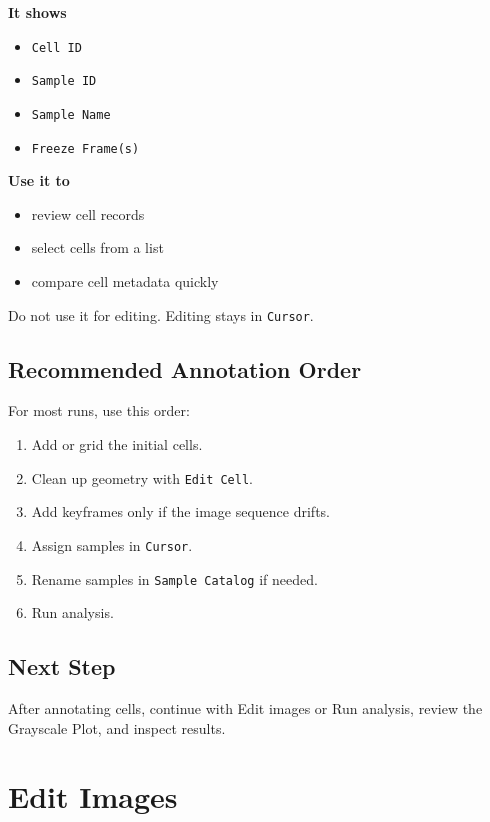 \documentclass[
  9pt,
  letterpaper,
  oneside,
  open=any,
  DIV=15,
  parskip=half-,
  headings=big,
  numbers=noenddot
]{scrbook}
\newcommand{\manuallead}[1]{%
  \vspace{0.15em}%
  {\sffamily\bfseries\color{ManualBlue}#1}\par\nobreak\vspace{0.05em}%
}
\begin{document}
\manuallead{It shows}

\begin{itemize}[leftmargin=*,itemsep=0.35em,topsep=0.4em]
\item \texttt{Cell ID}
\item \texttt{Sample ID}
\item \texttt{Sample Name}
\item \texttt{Freeze Frame(s)}
\end{itemize}

\manuallead{Use it to}

\begin{itemize}[leftmargin=*,itemsep=0.35em,topsep=0.4em]
\item review cell records
\item select cells from a list
\item compare cell metadata quickly
\end{itemize}

Do not use it for editing. Editing stays in \texttt{Cursor}.


\section{Recommended Annotation Order}

For most runs, use this order:


\begin{enumerate}[leftmargin=*,itemsep=0.35em,topsep=0.4em]
\item Add or grid the initial cells.
\item Clean up geometry with \texttt{Edit Cell}.
\item Add keyframes only if the image sequence drifts.
\item Assign samples in \texttt{Cursor}.
\item Rename samples in \texttt{Sample Catalog} if needed.
\item Run analysis.
\end{enumerate}

\section{Next Step}

After annotating cells, continue with Edit images or Run analysis, review the Grayscale Plot, and inspect results.


\chapter{Edit Images}
\end{document}
